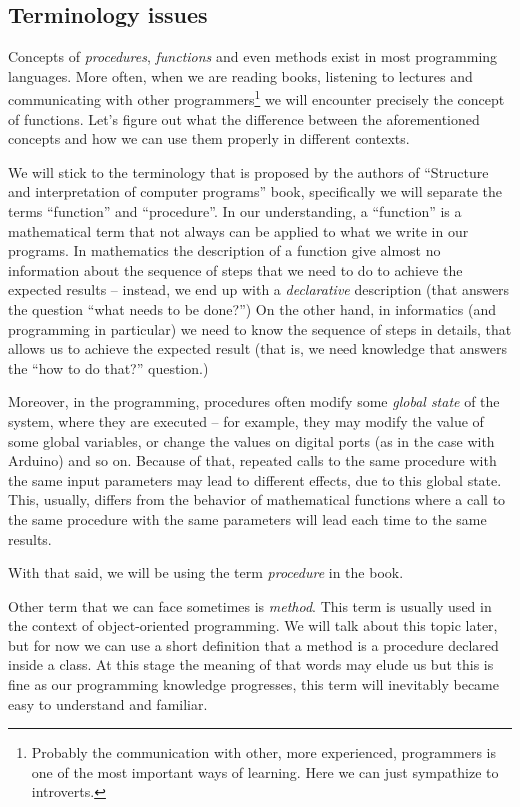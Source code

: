 \documentclass[../sparc.tex]{subfiles}
\begin{document}
\subsection{Terminology issues}

Concepts of \emph{procedures}, \emph{functions} and even methods exist in most
programming languages.  More often, when we are reading books, listening to
lectures and communicating with other programmers\footnote{Probably the
communication with other, more experienced, programmers is one of the most
important ways of learning.  Here we can just sympathize to introverts.} we will
encounter precisely the concept of functions.  Let's figure out what the
difference between the aforementioned concepts and how we can use them properly
in different contexts.

We will stick to the terminology that is proposed\cite[28]{sicp-en} by the
authors of ``Structure and interpretation of computer programs'' book,
specifically we will separate the terms ``function'' and ``procedure''.  In our
understanding, a ``function'' is a mathematical term that not always can be
applied to what we write in our programs.  In mathematics the description of a
function give almost no information about the sequence of steps that we need to
do to achieve the expected results -- instead, we end up with a
\emph{declarative} description (that answers the question ``what needs to be
done?'')  On the other hand, in informatics (and programming in particular) we
need to know the sequence of steps in details, that allows us to achieve the
expected result (that is, we need knowledge that answers the ``how to do that?''
question.)

Moreover, in the programming, procedures often modify some \emph{global state}
of the system, where they are executed -- for example, they may modify the value
of some global variables, or change the values on digital ports (as in the case
with Arduino) and so on.  Because of that, repeated calls to the same procedure
with the same input parameters may lead to different effects, due to this global
state.  This, usually, differs from the behavior of mathematical functions where
a call to the same procedure with the same parameters will lead each time to the
same results.

With that said, we will be using the term \emph{procedure} in the book.

Other term that we can face sometimes is \emph{method}.  This term is usually
used in the context of object-oriented programming.  We will talk about this
topic later, but for now we can use a short definition that a method is a
procedure declared inside a class.  At this stage the meaning of that words may
elude us but this is fine as our programming knowledge progresses, this term
will inevitably became easy to understand and familiar.
\end{document}
